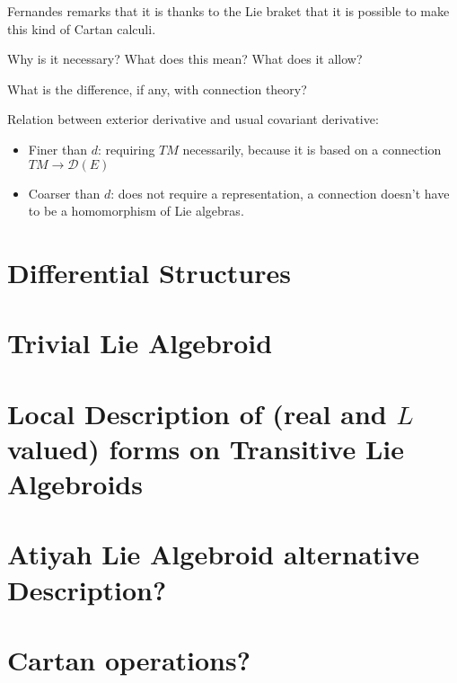 Fernandes remarks that it is thanks to the Lie braket that it is possible to make this kind of Cartan calculi.

Why is it necessary? What does this mean? What does it allow?

What is the difference, if any, with connection theory?

Relation between exterior derivative and usual covariant derivative:
    \begin{itemize}
    
    \item Finer than $d$: requiring $TM$ necessarily, because it is based on a connection $TM \to \mathcal D(E)$
    
    \item Coarser than $d$: does not require a representation, a connection doesn't have to be a homomorphism of Lie algebras.
        
    \end{itemize}

\section{Differential Structures}
\section{Trivial Lie Algebroid}
\section{Local Description of (real and $L$ valued) forms on Transitive Lie Algebroids}
\section{Atiyah Lie Algebroid alternative Description?}
\section{Cartan operations?}

